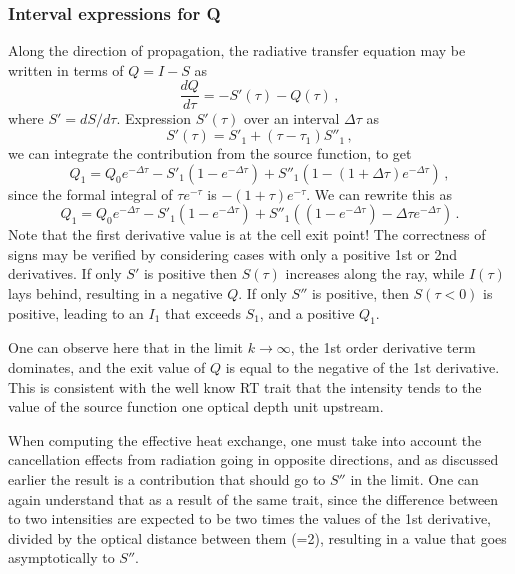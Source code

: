 \documentclass[paper=a4,fontsize=11pt]{scrartcl}
\numberwithin{equation}{section}		%
\numberwithin{figure}{section}			%
\numberwithin{table}{section}				%
\begin{document}
\subsubsection{Interval expressions for Q}
Along the direction of propagation, the radiative transfer equation may be written in terms of $Q=I-S$ as
\begin{equation}
    \frac{dQ}{d\tau} = - S'(\tau) - Q(\tau)\,,
\end{equation}
where $S' = dS/d\tau$.  Expression $S'(\tau)$ over an interval $\Delta\tau$ as
\begin{equation}
    S'(\tau) = S'_1 + (\tau-\tau_1) S''_1\,,
\end{equation}
we can integrate the contribution from the source function, to get
\begin{equation}
    Q_1 = 
    Q_0 e^{-\Delta\tau} - 
    S'_1 (1-e^{-\Delta\tau}) + 
    S''_1 (1-(1+\Delta\tau) e^{-\Delta\tau} )\,,
\end{equation}
since the formal integral of $\tau e^{-\tau}$ is $-(1+\tau) e^{-\tau}$.  We can rewrite this as
\begin{equation}
    Q_1 = 
    Q_0 e^{-\Delta\tau} - 
    S'_1 (1-e^{-\Delta\tau}) +
    S''_1 ((1-e^{-\Delta\tau}) - \Delta\tau e^{-\Delta\tau} )\,.
\end{equation}
Note that the first derivative value is at the cell exit point! The correctness of signs may be verified by considering cases with only a positive 1st or 2nd derivatives.  If only $S'$ is positive then $S(\tau)$ increases along the ray, while $I(\tau)$ lays behind, resulting in a negative  $Q$.  If only $S''$ is positive, then $S(\tau <0)$ is positive, leading to an $I_1$ that exceeds $S_1$, and a positive $Q_1$.

One can observe here that in the limit $k \rightarrow \infty$, the 1st order derivative term dominates, and the exit value of $Q$ is equal to the negative of the 1st derivative.  This is consistent with the well know RT trait that the intensity tends to the value of the source function one optical depth unit upstream.

When computing the effective heat exchange, one must take into account the cancellation effects from radiation going in opposite directions, and as discussed earlier the result is a contribution that should go to $S''$ in the limit.  One can again understand that as a result of the same trait, since the difference between to two intensities are expected to be two times the values of the 1st derivative, divided by the optical distance between them (=2), resulting in a value that goes asymptotically to $S''$. 
\end{document}
